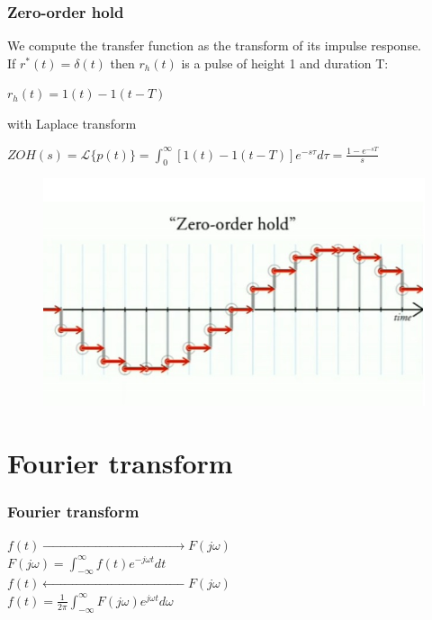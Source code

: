 \begin{frame}
	\frametitle{Zero-order hold}
	We compute the transfer function as the transform of its impulse response. \\
	\medskip
	If $r^*(t)=\delta(t)$ then $r_h(t)$ is a pulse of height 1 and duration T:\\
	\begin{center}
		$r_h(t) = 1(t) - 1(t-T)$\\
	\end{center}
	with Laplace transform\\
	\begin{center}
		$ZOH(s)=\mathcal{L}\{p(t)\} = \int_{0}^{\infty} [1(t)-1(t-T)]e^{-s\tau}d\tau = \frac{1-e^{-sT}}{s}$
	\end{center}
	\begin{figure}
		\includegraphics[width=0.48\linewidth]{zoh}
	\end{figure}
\end{frame}


\section{Fourier transform}

\begin{frame}
	\frametitle{Fourier transform}
	\vspace{-2ex}
	\begin{center}
		\Large{
		$f(t)\xrightarrow{\qquad \qquad \qquad \qquad \qquad \qquad \qquad \qquad}F(j\omega)$\\
		$F(j\omega) = \int_{-\infty}^{\infty} f(t)e^{-j\omega t} dt$\\
		\bigskip
		$f(t)\xleftarrow{\qquad \qquad \qquad \qquad \qquad \qquad \qquad \qquad}F(j\omega)$\\
		$f(t) = \frac{1}{2\pi} \int_{-\infty}^{\infty} F(j\omega) e^{j\omega t} d\omega$}
	\end{center}
\end{frame}

